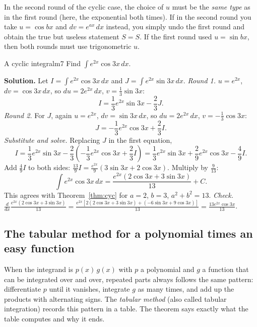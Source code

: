 \documentclass[11pt]{article}
\begin{document}
\begin{warn}
In the second round of the cyclic case, the choice of $u$ must be the \emph{same type} as in the first round (here, the exponential both times). If in the second round you take $u=\cos bx$ and $dv=e^{ax}\,dx$ instead, you simply undo the first round and obtain the true but useless statement $S=S$. If the first round used $u=\sin bx$, then both rounds must use trigonometric $u$.
\end{warn}

\begin{exmp}{A cyclic integral}{m7}
Find $\int e^{2x}\cos3x\,dx$.

\textbf{Solution.} Let $I=\int e^{2x}\cos3x\,dx$ and $J=\int e^{2x}\sin3x\,dx$. \emph{Round 1.} $u=e^{2x}$, $dv=\cos3x\,dx$, so $du=2e^{2x}\,dx$, $v=\frac13\sin3x$:
\[I=\frac13e^{2x}\sin3x-\frac23J .\]
\emph{Round 2.} For $J$, again $u=e^{2x}$, $dv=\sin3x\,dx$, so $du=2e^{2x}\,dx$, $v=-\frac13\cos3x$:
\[J=-\frac13e^{2x}\cos3x+\frac23I .\]
\emph{Substitute and solve.} Replacing $J$ in the first equation,
\[I=\frac13e^{2x}\sin3x-\frac23\left(-\frac13e^{2x}\cos3x+\frac23I\right)=\frac13e^{2x}\sin3x+\frac29e^{2x}\cos3x-\frac49I .\]
Add $\frac49I$ to both sides: $\frac{13}9I=\frac{e^{2x}}9\left(3\sin3x+2\cos3x\right)$. Multiply by $\frac9{13}$:
\[\int e^{2x}\cos3x\,dx=\frac{e^{2x}\left(2\cos3x+3\sin3x\right)}{13}+C .\]
This agrees with Theorem~\ref{thm:cyc} for $a=2$, $b=3$, $a^2+b^2=13$. \emph{Check.} $\frac{d}{dx}\frac{e^{2x}(2\cos3x+3\sin3x)}{13}=\frac{e^{2x}\left[2(2\cos3x+3\sin3x)+(-6\sin3x+9\cos3x)\right]}{13}=\frac{13e^{2x}\cos3x}{13}$.
\end{exmp}

\subsection*{The tabular method for a polynomial times an easy function}

When the integrand is $p(x)\,g(x)$ with $p$ a polynomial and $g$ a function that can be integrated over and over, repeated parts always follows the same pattern: differentiate $p$ until it vanishes, integrate $g$ as many times, and add up the products with alternating signs. The \emph{tabular method} (also called tabular integration) records this pattern in a table. The theorem says exactly what the table computes and why it ends.
\end{document}

